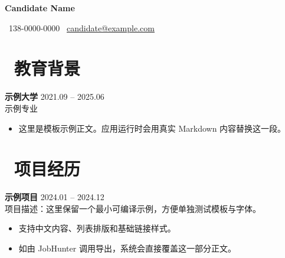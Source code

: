 \documentclass[11pt]{article}
\newlength{\intraProjectTitleSep}
\newcommand{\titlebreak}{\\[\intraProjectTitleSep]}
\newlength{\intraProjectListTopSep}
\begin{document}

\centerline{\LARGE\bfseries{Candidate Name}}
\centerline{\normalsize{\faPhone\ 138-0000-0000 \quad \faEnvelopeO\ \href{mailto:candidate@example.com}{candidate@example.com}}}

\section{\makebox[\widthof{\faGraduationCap}][c]{\color{CVBlue}\faGraduationCap}\ 教育背景}
\textbf{示例大学} \hfill 2021.09 -- 2025.06\\[0.5em]
示例专业
\begin{itemize}[nosep]
    \item 这里是模板示例正文。应用运行时会用真实 Markdown 内容替换这一段。
\end{itemize}

\section{\makebox[\widthof{\faUsers}][c]{\color{CVBlue}\faUsers}\ 项目经历}
\textbf{示例项目} \hfill 2024.01 -- 2024.12 \titlebreak
项目描述：这里保留一个最小可编译示例，方便单独测试模板与字体。
\begin{itemize}[nosep, topsep=\intraProjectListTopSep]
    \item 支持中文内容、列表排版和基础链接样式。
    \item 如由 JobHunter 调用导出，系统会直接覆盖这一部分正文。
\end{itemize}
\end{document}
